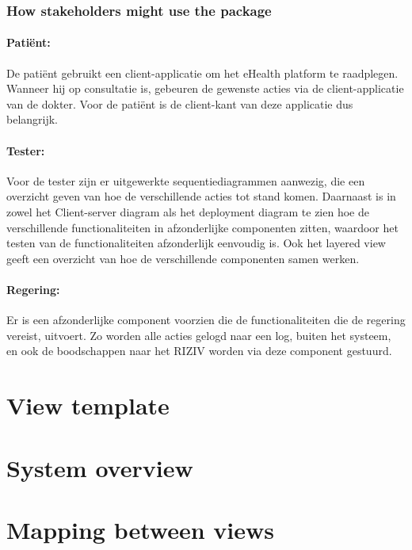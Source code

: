 \documentclass[a4paper,10pt]{article}
\begin{document}
\subsubsection{How stakeholders might use the package}

\paragraph{Patiënt:}
De patiënt gebruikt een client-applicatie om het eHealth platform te raadplegen. Wanneer hij op consultatie is, gebeuren de gewenste acties via de client-applicatie van de dokter. Voor de patiënt is de client-kant van deze applicatie dus belangrijk.

\paragraph{Tester:}
Voor de tester zijn er uitgewerkte sequentiediagrammen aanwezig, die een overzicht geven van hoe de verschillende acties tot stand komen. Daarnaast is in zowel het Client-server diagram als het deployment diagram te zien hoe de verschillende functionaliteiten in afzonderlijke componenten zitten, waardoor het testen van de functionaliteiten afzonderlijk eenvoudig is. Ook het layered view geeft een overzicht van hoe de verschillende componenten samen werken.

\paragraph{Regering:}
Er is een afzonderlijke component voorzien die de functionaliteiten die de regering vereist, uitvoert. Zo worden alle acties gelogd naar een log, buiten het systeem, en ook de boodschappen naar het RIZIV worden via deze component gestuurd. 

\clearpage
\section{View template}

\clearpage
\section{System overview}

\clearpage
\section{Mapping between views}

\clearpage
\end{document}
